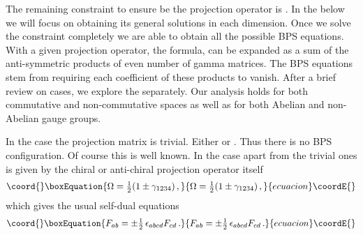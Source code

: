 \documentclass[a4paper,11pt]{article}
\begin{document}
The remaining constraint to ensure \myHighlight{$\Omega$}\coordHE{} be the projection operator is \coordHE{}. In the below we will focus on obtaining its general
solutions in each dimension. Once we solve the constraint completely we are able to obtain all the possible  BPS equations. With a given projection
operator, the formula,  \coordHE{} can be expanded as a sum of the anti-symmetric products of even number of gamma matrices. The
BPS equations stem from requiring each coefficient of these products to vanish. After a brief review on \coordHE{} cases, we explore the \coordHE{}
separately. Our analysis holds for both commutative and non-commutative spaces as well as for both Abelian and non-Abelian gauge groups.


In the \coordHE{} case the projection matrix is trivial. Either \coordHE{} or \coordHE{}. Thus there is no BPS configuration. Of course this is well known. In
the \coordHE{} case apart from the trivial ones \myHighlight{$\Omega$}\coordHE{} is given by the chiral or anti-chiral projection operator itself
\begin{equation}\coord{}\boxEquation{
\Omega=\textstyle{\frac{1}{2}}(1\pm\gamma_{1234})\,,
}{
\Omega=\textstyle{\frac{1}{2}}(1\pm\gamma_{1234})\,,
}{ecuacion}\coordE{}\end{equation}
which gives the usual self-dual equations
\begin{equation}\coord{}\boxEquation{
F_{ab}=\pm\textstyle{\frac{1}{2}}\,\epsilon_{abcd}F_{cd}\,.
}{
F_{ab}=\pm\textstyle{\frac{1}{2}}\,\epsilon_{abcd}F_{cd}\,.
}{ecuacion}\coordE{}\end{equation}

\end{document}
